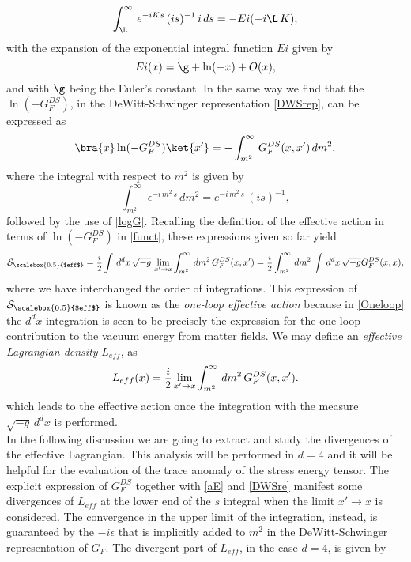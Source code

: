 \documentclass[a4paper,11pt,openright,twoside]{book}
\let\e=\epsilon \let\z=\zeta   \let\h=\eta     \let\q=\theta
\newcommand{\sdfrac}[2]{\mbox{\small$\displaystyle\frac{#1}{#2}$}}
\numberwithin{equation}{section}
\begin{document}
{{{	\begin{equation}
		\int_{\L}^{\infty}\,e^{-iKs}\,(is)^{-1}\,i\,ds=-Ei(-i\L\,K)\label{inte},
	\end{equation}
	with the expansion of the exponential integral function $Ei$ given by
	\begin{equation}
		Ei(x)=\g+\ln(-x)+O(x),\label{exp}
	\end{equation}
	and with $\g$ being the Euler's constant. In the same way we find that the $\ln(-G_F^{DS})$, in the DeWitt-Schwinger representation \eqref{DWSrep}, can be expressed as
	\begin{equation}
		\bra{x}\ln(-G_F^{DS})\ket{x'}=-\int_{m^2}^\infty\,G^{DS}_F(x,x')\,dm^2,
	\end{equation}
	where the integral with respect to $m^2$ is given by
	\begin{equation}
		\int_{m^2}^\infty\,\e^{-i\,m^2\,s}\,dm^2=e^{-i\,m^2\,s}\,(is)^{-1},
	\end{equation}
	followed by the use of \eqref{logG}.
	Recalling the definition of the effective action in terms of $\ln(-G_F^{DS})$ in \eqref{funct}, these expressions given so far yield
	\begin{equation}
		\mathcal{S}_{\scalebox{0.5}{$eff$}}=\sdfrac{i}{2}\int\,d^dx\,\sqrt{-g}\,\lim_{x'\to x}\int_{m^2}^\infty\,dm^2\,G_F^{DS}(x,x')=\sdfrac{i}{2}\int_{m^2}^\infty\,dm^2\,\int\,d^dx\,\sqrt{-g} G_F^{DS}(x,x),\label{Oneloop}
	\end{equation}
	where we have interchanged the order of integrations. This expression of $\mathcal{S}_{\scalebox{0.5}{$eff$}}$ is known as the \emph{one-loop effective action} because in \eqref{Oneloop} the $d^dx$ integration is seen to be precisely the expression for the one-loop contribution to the vacuum energy from matter fields. We may define an \emph{effective Lagrangian density} $L_{eff}$, as
	\begin{equation}
		L_{eff}(x)=\sdfrac{i}{2}\lim_{x'\to x}\int_{m^2}^\infty\,dm^2\,G_F^{DS}(x,x').
	\end{equation}
	which leads to the effective action once the integration with the measure $\sqrt{-g}\,d^dx$ is performed. \\
	In the following discussion we are going to extract and study the divergences of the effective Lagrangian. This analysis will be performed in $d=4$ and it will be helpful for the evaluation of the trace anomaly of the stress energy tensor. The explicit expression of $G_F^{DS}$ together with \eqref{aE} and \eqref{DWSre} manifest some divergences of $L_{eff}$ at the lower end of the $s$ integral when the limit $x'\to x$ is considered. The convergence in the upper limit of the integration, instead, is guaranteed by the $-i\epsilon$ that is implicitly added to $m^2$ in the DeWitt-Schwinger representation of $G_F$. The divergent part of $L_{eff}$, in the case $d=4$, is given by 
}}}
\end{document}

